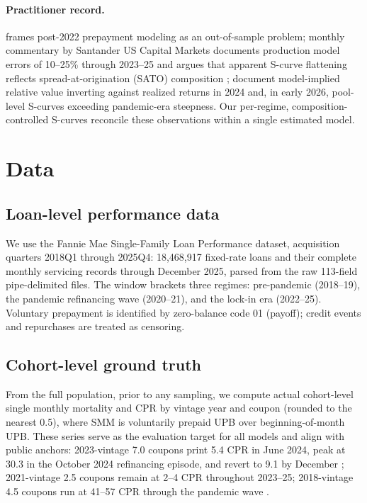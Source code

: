 \documentclass[11pt]{article}
\begin{document}
\paragraph{Practitioner record.} \citet{yu2023uncharted} frames post-2022 prepayment modeling as
an out-of-sample problem; monthly commentary by Santander US Capital Markets documents production
model errors of 10--25\% through 2023--25 and argues that apparent S-curve flattening reflects
spread-at-origination (SATO) composition \citep{sancap2024scurves}; \citet{katz2024models} document
model-implied relative value inverting against realized returns in 2024 and, in early 2026,
pool-level S-curves exceeding pandemic-era steepness. Our per-regime, composition-controlled
S-curves reconcile these observations within a single estimated model.

\section{Data}
\label{sec:data}

\subsection{Loan-level performance data}

We use the Fannie Mae Single-Family Loan Performance dataset, acquisition quarters 2018Q1 through
2025Q4: 18,468,917 fixed-rate loans and their complete monthly servicing records through December
2025, parsed from the raw 113-field pipe-delimited files. The window brackets three regimes:
pre-pandemic (2018--19), the pandemic refinancing wave (2020--21), and the lock-in era
(2022--25). Voluntary prepayment is identified by zero-balance code 01 (payoff); credit events
and repurchases are treated as censoring.

\subsection{Cohort-level ground truth}

From the full population, prior to any sampling, we compute actual cohort-level single monthly
mortality and CPR by vintage year and coupon (rounded to the nearest 0.5), where SMM is
voluntarily prepaid UPB over beginning-of-month UPB. These series serve as the evaluation target
for all models and align with public anchors: 2023-vintage 7.0 coupons print 5.4 CPR in June
2024, peak at 30.3 in the October 2024 refinancing episode, and revert to 9.1 by December
\citep{fhfa2024pmr}; 2021-vintage 2.5 coupons remain at 2--4 CPR throughout 2023--25; 2018-vintage
4.5 coupons run at 41--57 CPR through the pandemic wave \citep{haughwout2023refi}.
\end{document}
